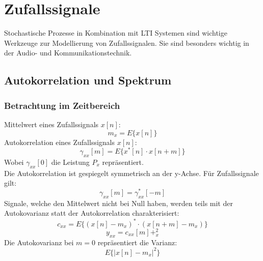 



\chapter{Zufallssignale}
Stochastische Prozesse in Kombination mit LTI Systemen sind wichtige Werkzeuge zur Modellierung 
von Zufallssignalen. Sie sind besonders wichtig in der Audio- und Kommunikationstechnik.
\section{Autokorrelation und Spektrum}
\subsection{Betrachtung im Zeitbereich}
Mittelwert eines Zufallssignals $x[n]$:
\[ m_x = E\{x[n]\} \]
Autokorrelation eines Zufallssignals $x[n]$:
\[ \gamma_{xx}[m] = E\{x^*[n] \cdot x[n+m]\} \]
Wobei $\gamma_{xx}[0]$ die Leistung $P_x$ repräsentiert.\\
Die Autokorrelation ist gespiegelt symmetrisch an der y-Achse. Für Zufallssignale gilt:
\[ \gamma_{xx}[m] = \gamma_{xx}^*[-m] \]
Signale, welche den Mittelwert nicht bei Null haben, werden teils mit der Autokovarianz
statt der Autokorrelation charakterisiert:
\[ c_{xx} = E\{ (x[n]-m_x)^*\cdot(x[n+m]-m_x) \} \]
\[ y_{xx} = c_{xx}[m] + _x^2 \]
Die Autokovarianz bei $m=0$ repräsentiert die Varianz:
\[ E\{|x[n]-m_x|^2\} \]
